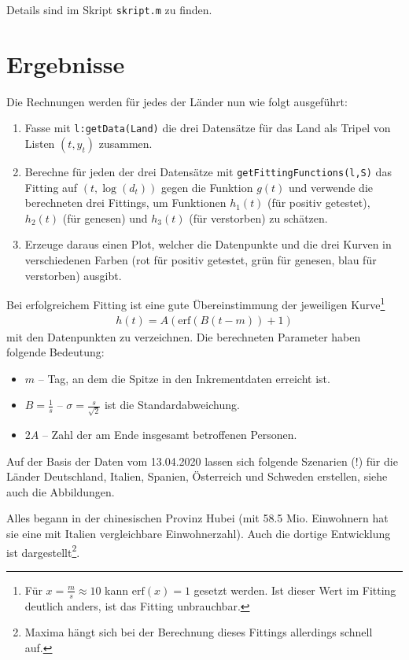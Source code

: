 \documentclass[a4paper,11pt]{article}
\newcommand{\br}[1]{\left(#1\right)}
\newcommand{\erf}{\mathrm{erf}}
\begin{document}
Details sind im Skript \texttt{skript.m} zu finden.

\section{Ergebnisse}

Die Rechnungen werden für jedes der Länder nun wie folgt ausgeführt:
\begin{enumerate}
\item Fasse mit \texttt{l:getData(Land)} die drei Datensätze für das Land als
  Tripel von Listen $(t,y_t)$ zusammen.
\item Berechne für jeden der drei Datensätze mit
  \texttt{getFittingFunctions(l,S)} das Fitting auf $(t,\log(d_t))$ gegen die
  Funktion $g(t)$ und verwende die berechneten drei Fittings, um Funktionen
  $h_1(t)$ (für positiv getestet), $h_2(t)$ (für genesen) und $h_3(t)$ (für
  verstorben) zu schätzen.
\item Erzeuge daraus einen Plot, welcher die Datenpunkte und die drei Kurven
  in verschiedenen Farben (rot für positiv getestet, grün für genesen, blau
  für verstorben) ausgibt.
\end{enumerate}
Bei erfolgreichem Fitting ist eine gute Übereinstimmung der jeweiligen
Kurve\footnote{Für $x=\frac{m}{s}\approx 10$ kann $\erf(x)=1$ gesetzt werden.
Ist dieser Wert im Fitting deutlich anders, ist das Fitting unbrauchbar.}
\begin{gather*}
  h(t)=A\br{\erf\br{B(t-m)}+1}
\end{gather*}
mit den Datenpunkten zu verzeichnen.  Die berechneten Parameter haben folgende
Bedeutung:
\begin{itemize}
\item $m$ -- Tag, an dem die Spitze in den Inkrementdaten erreicht ist.
\item $B=\frac{1}{s}$ -- $\sigma=\frac{s}{\sqrt{2}}$ ist die
  Standardabweichung.
\item $2A$ -- Zahl der am Ende insgesamt betroffenen Personen. 
\end{itemize}

Auf der Basis der Daten vom 13.04.2020 lassen sich folgende Szenarien (!) für
die Länder Deutschland, Italien, Spanien, Österreich und Schweden erstellen,
siehe auch die Abbildungen.

Alles begann in der chinesischen Provinz Hubei (mit 58.5 Mio. Einwohnern hat
sie eine mit Italien vergleichbare Einwohnerzahl).  Auch die dortige
Entwicklung ist dargestellt\footnote{Maxima hängt sich bei der Berechnung
  dieses Fittings allerdings schnell auf.}.
\end{document}
